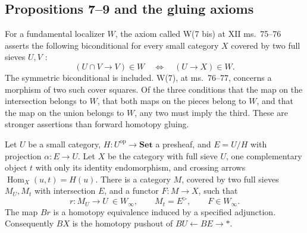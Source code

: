 \subsection{Propositions 7--9 and the gluing axioms}

\begin{definition}\label{A:audit-gluing}
For a fundamental localizer $W$, the axiom called W(7 bis) at XII ms.~75--76 asserts the following biconditional for every small category $X$ covered by two full sieves $U,V$ \citep{GrothendieckDerivateursXIIb}:
\[
 (U\cap V\longrightarrow V)\in W
 \quad\Longleftrightarrow\quad
 (U\longrightarrow X)\in W.
\]
The symmetric biconditional is included. W(7), at ms.~76--77, concerns a morphism of two such cover squares. Of the three conditions that the map on the intersection belongs to $W$, that both maps on the pieces belong to $W$, and that the map on the union belongs to $W$, any two must imply the third. These are stronger assertions than forward homotopy gluing.
\end{definition}

\begin{lemma}\label{A:audit-cylinder}
Let $U$ be a small category, $H:U^{\mathrm{op}}\to\mathbf{Set}$ a presheaf, and $E=U/H$ with projection $\alpha:E\to U$. Let $X$ be the category with full sieve $U$, one complementary object $t$ with only its identity endomorphism, and crossing arrows $\operatorname{Hom}_X(u,t)=H(u)$. There is a category $M$, covered by two full sieves $M_U,M_t$ with intersection $E$, and a functor $F:M\to X$, such that
\[
 r:M_U\longrightarrow U\ \in W_\infty,
 \qquad M_t=E^{\triangleright},\qquad F\in W_\infty.
\]
The map $Br$ is a homotopy equivalence induced by a specified adjunction. Consequently $BX$ is the homotopy pushout of $BU\leftarrow BE\to *$.
\end{lemma}

